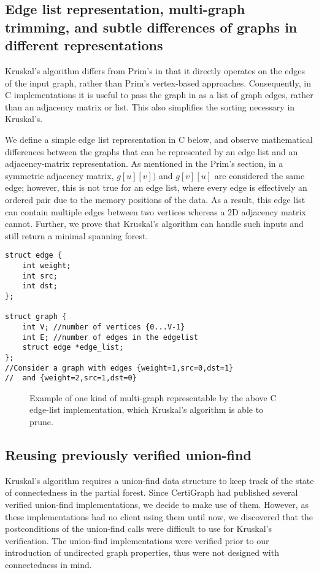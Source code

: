 \subsection{Edge list representation, multi-graph trimming, and subtle differences of graphs in different representations}
Kruskal's algorithm differs from Prim's in that it directly operates on the edges of the input graph, rather than Prim's vertex-based approaches. Consequently, in C implementations it is useful to pass the graph in as a list of graph edges, rather than an adjacency matrix or list. This also simplifies the sorting necessary in Kruskal's.

We define a simple edge list representation in C below, and observe mathematical differences between the graphs that can be represented by an edge list and an adjacency-matrix representation. As mentioned in the Prim's section, in a symmetric adjacency matrix, $g[u][v])$ and $g[v][u]$ are considered the same edge; however, this is not true for an edge list, where every edge is effectively an ordered pair due to the memory positions of the data. As a result, this edge list can contain multiple edges between two vertices whereas a 2D adjacency matrix cannot. Further, we prove that Kruskal's algorithm can handle such inputs and still return a minimal spanning forest.
\newline
\begin{lstlisting}
struct edge {
	int weight;
	int src;
	int dst;
};

struct graph {
	int V; //number of vertices {0...V-1}
	int E; //number of edges in the edgelist
	struct edge *edge_list;
};
//Consider a graph with edges {weight=1,src=0,dst=1}
//	and {weight=2,src=1,dst=0}
\end{lstlisting}
\begin{figure}
\caption{Example of one kind of multi-graph representable by the above C edge-list implementation, which Kruskal's algorithm is able to prune.}
\end{figure}

\subsection{Reusing previously verified union-find} %
Kruskal's algorithm requires a union-find data structure to keep track of the state of connectedness in the partial forest. Since CertiGraph had published several verified union-find implementations, we decide to make use of them. However, as these implementations had no client using them until now, we discovered that the postconditions of the union-find calls were difficult to use for Kruskal's verification. The union-find implementations were verified prior to our introduction of undirected graph properties, thus were not designed with connectedness in mind.

